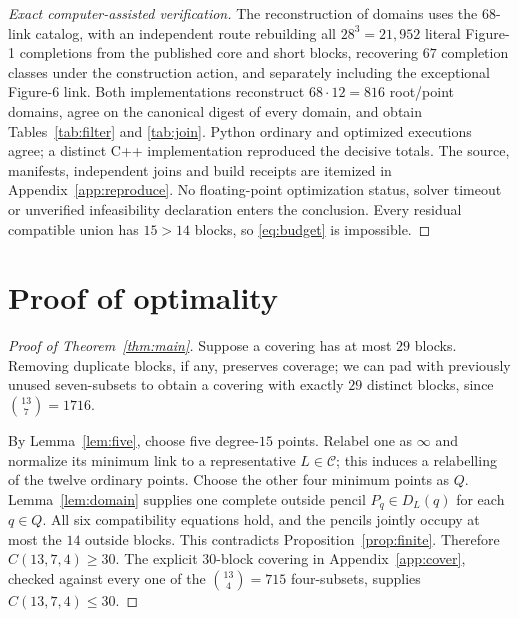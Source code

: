 \documentclass[11pt]{article}
\newcommand{\bin}[2]{\binom{#1}{#2}}
\newcommand{\cat}{\mathcal C}
\theoremstyle{definition}
\theoremstyle{remark}
\begin{document}
\begin{proof}[Exact computer-assisted verification]
The reconstruction of domains uses the $68$-link catalog,
with an independent route rebuilding all $28^3=21{,}952$ literal
Figure-1 completions from the published core and short blocks,
recovering $67$ completion classes under the construction action,
and separately including the exceptional Figure-6 link.
Both implementations reconstruct $68\cdot12=816$ root/point domains,
agree on the canonical digest of every domain, and obtain
Tables~\ref{tab:filter} and \ref{tab:join}.
Python ordinary and optimized executions agree; a distinct C++
implementation reproduced the decisive totals. The source, manifests,
independent joins and build receipts are itemized in
Appendix~\ref{app:reproduce}. No floating-point optimization
status, solver timeout or unverified infeasibility declaration enters
the conclusion. Every residual compatible union has $15>14$ blocks,
so \eqref{eq:budget} is impossible.
\end{proof}

\section{Proof of optimality}
\begin{proof}[Proof of Theorem~\ref{thm:main}]
Suppose a covering has at most $29$ blocks. Removing duplicate blocks,
if any, preserves coverage; we can pad with previously unused
seven-subsets to obtain a covering with exactly $29$ distinct blocks,
since $\bin{13}{7}=1716$.

By Lemma~\ref{lem:five}, choose five degree-$15$ points. Relabel one
as $\infty$ and normalize its minimum link to a representative
$L\in\cat$; this induces a relabelling of the twelve ordinary points.
Choose the other four minimum points as $Q$.
Lemma~\ref{lem:domain} supplies one complete outside pencil
$P_q\in D_L(q)$ for each $q\in Q$. All six compatibility equations
hold, and the pencils jointly occupy at most the $14$ outside blocks.
This contradicts Proposition~\ref{prop:finite}. Therefore
$C(13,7,4)\ge30$. The explicit $30$-block covering in
Appendix~\ref{app:cover}, checked against every one of the
$\bin{13}{4}=715$ four-subsets, supplies $C(13,7,4)\le30$.
\end{proof}
\end{document}
